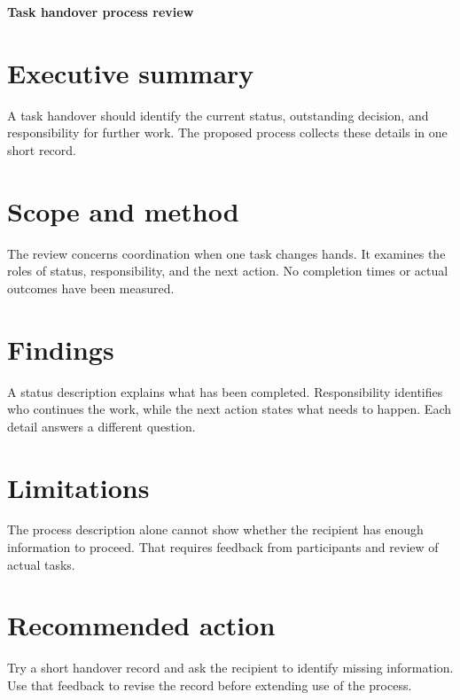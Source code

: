 \def\lakitlanguageprofile{english}
\def\lakitmainlanguage{english}
\def\lakitdocumentclass{article}
\def\lakitclassoptions{11pt,a4paper}
\def\lakitgeometryoptions{margin=2.2cm,headheight=14pt}
\def\lakitlinespread{1.18}
\def\lakitparagraphstyle{block}




{\LARGE\sffamily\bfseries\noindent Task handover process review\par}\medskip
\section{Executive summary}
A task handover should identify the current status, outstanding decision, and
responsibility for further work. The proposed process collects these details
in one short record.
\section{Scope and method}
The review concerns coordination when one task changes hands. It examines the
roles of status, responsibility, and the next action. No completion times or
actual outcomes have been measured.
\section{Findings}
A status description explains what has been completed. Responsibility identifies
who continues the work, while the next action states what needs to happen.
Each detail answers a different question.
\section{Limitations}
The process description alone cannot show whether the recipient has enough
information to proceed. That requires feedback from participants and review
of actual tasks.
\section{Recommended action}
Try a short handover record and ask the recipient to identify missing information.
Use that feedback to revise the record before extending use of the process.

